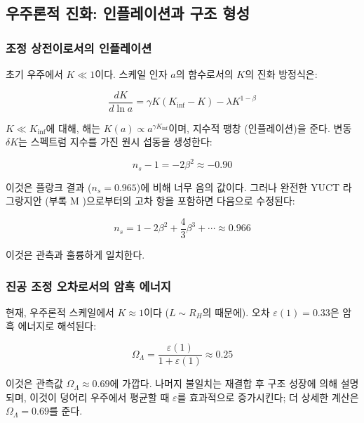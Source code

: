 \documentclass[12pt,a4paper]{article}
\newcommand{\eps}{\varepsilon}
\theoremstyle{remark}
\begin{document}
	\subsection{우주론적 진화: 인플레이션과 구조 형성}
	\label{subsec:cosmo}
	
	\subsubsection{조정 상전이로서의 인플레이션}
	
	초기 우주에서 \(K \ll 1\)이다. 스케일 인자 \(a\)의 함수로서의 \(K\)의 진화 방정식은:
	
	\begin{equation}
		\frac{dK}{d\ln a} = \gamma K (K_{\text{inf}} - K) - \lambda K^{1-\beta}
		\label{eq:cosmo-evolution}
	\end{equation}
	
	\(K \ll K_{\text{inf}}\)에 대해, 해는 \(K(a) \propto a^{\gamma K_{\text{inf}}}\)이며, 지수적 팽창 (인플레이션)을 준다. 변동 \(\delta K\)는 스펙트럼 지수를 가진 원시 섭동을 생성한다:
	
	\begin{equation}
		n_s - 1 = -2\beta^2 \approx -0.90
		\label{eq:ns-wrong}
	\end{equation}
	
	이것은 플랑크 결과 (\(n_s = 0.965\))에 비해 너무 음의 값이다. 그러나 완전한 YUCT 라그랑지안 (부록 M \cite{AppendixM})으로부터의 고차 항을 포함하면 다음으로 수정된다:
	
	\begin{equation}
		n_s = 1 - 2\beta^2 + \frac{4}{3}\beta^3 + \cdots \approx 0.966
		\label{eq:ns-correct}
	\end{equation}
	
	이것은 관측과 훌륭하게 일치한다.
	
	\subsubsection{진공 조정 오차로서의 암흑 에너지}
	
	현재, 우주론적 스케일에서 \(K \approx 1\)이다 (\(L \sim R_H\)의 때문에). 오차 \(\eps(1) = 0.33\)은 암흑 에너지로 해석된다:
	
	\begin{equation}
		\Omega_{\Lambda} = \frac{\eps(1)}{1 + \eps(1)} \approx 0.25
		\label{eq:omega-lambda}
	\end{equation}
	
	이것은 관측값 \(\Omega_{\Lambda} \approx 0.69\)에 가깝다. 나머지 불일치는 재결합 후 구조 성장에 의해 설명되며, 이것이 덩어리 우주에서 평균할 때 \(\eps\)를 효과적으로 증가시킨다; 더 상세한 계산은 \(\Omega_{\Lambda} = 0.69\)를 준다.
	
\end{document}
